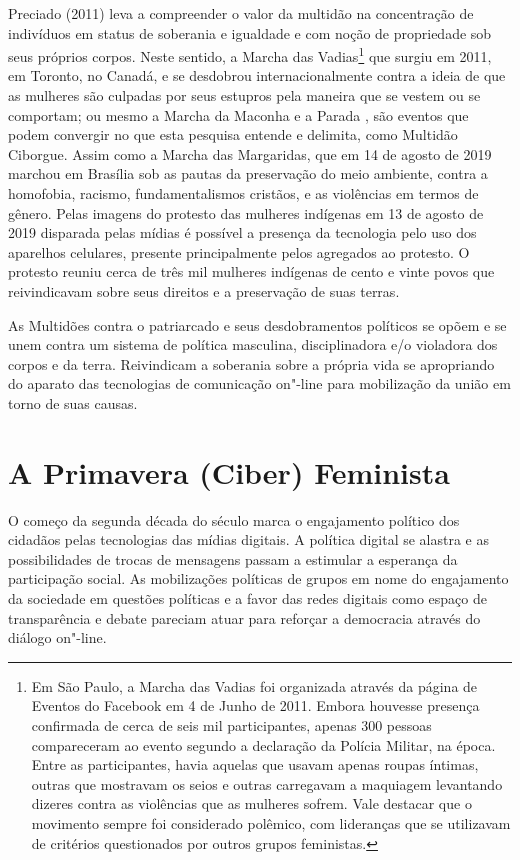 Preciado (2011) leva a compreender o valor da multidão na concentração
de indivíduos em status de soberania e igualdade e com noção de
propriedade sob seus próprios corpos. Neste sentido, a Marcha das
Vadias\footnote{Em São Paulo, a Marcha das Vadias foi organizada através
  da página de Eventos do Facebook em 4 de Junho de 2011. Embora
  houvesse presença confirmada de cerca de seis mil participantes,
  apenas 300 pessoas compareceram ao evento segundo a declaração da
  Polícia Militar, na época. Entre as participantes, havia aquelas que
  usavam apenas roupas íntimas, outras que mostravam os seios e outras
  carregavam a maquiagem levantando dizeres contra as violências que as
  mulheres sofrem. Vale destacar que o movimento sempre foi considerado
  polêmico, com lideranças que se utilizavam de critérios questionados
  por outros grupos feministas.} que surgiu em 2011, em Toronto, no
Canadá, e se desdobrou internacionalmente contra a ideia de que as
mulheres são culpadas por seus estupros pela maneira que se vestem ou se
comportam; ou mesmo a Marcha da Maconha e a Parada , são eventos
que podem convergir no que esta pesquisa entende e delimita, como
Multidão Ciborgue. Assim como a Marcha das Margaridas, que em 14 de
agosto de 2019 marchou em Brasília sob as pautas da preservação do meio
ambiente, contra a homofobia, racismo, fundamentalismos cristãos, e as
violências em termos de gênero. Pelas imagens do protesto das mulheres
indígenas em 13 de agosto de 2019 disparada pelas mídias é possível a
presença da tecnologia pelo uso dos aparelhos celulares, presente
principalmente pelos agregados ao protesto. O protesto reuniu cerca de
três mil mulheres indígenas de cento e vinte povos que reivindicavam
sobre seus direitos e a preservação de suas terras.

As Multidões contra o patriarcado e seus desdobramentos políticos se
opõem e se unem contra um sistema de política masculina, disciplinadora
e/o violadora dos corpos e da terra. Reivindicam a soberania sobre a
própria vida se apropriando do aparato das tecnologias de comunicação
on"-line para mobilização da união em torno de suas causas.

\section{A Primavera (Ciber) Feminista}

O começo da segunda década do século  marca o engajamento político dos
cidadãos pelas tecnologias das mídias digitais. A política digital se
alastra e as possibilidades de trocas de mensagens passam a estimular a
esperança da participação social. As mobilizações políticas de grupos em
nome do engajamento da sociedade em questões políticas e a favor das
redes digitais como espaço de transparência e debate pareciam atuar para
reforçar a democracia através do diálogo on"-line.

